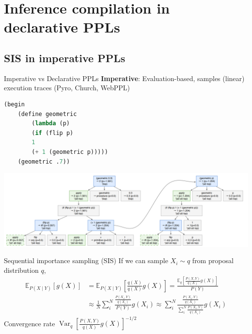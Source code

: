\documentclass[12pt]{beamer}
\DeclareMathOperator*{\Var}{Var}
\begin{document}
\section{Inference compilation in declarative PPLs}

\subsection{SIS in imperative PPLs}

\begin{frame}[fragile]{Imperative vs Declarative PPLs}
    \textbf{Imperative}: Evaluation-based, samples (linear) execution traces
        (Pyro, Church, WebPPL)
    \pause
    \begin{lstlisting}[language=lisp]
(begin
    (define geometric
        (lambda (p)
        (if (flip p)
        1
        (+ 1 (geometric p)))))
    (geometric .7))
        \end{lstlisting}

        \includegraphics[width=1.0\textwidth]{figures/execution-trace.png}
\end{frame}

\begin{frame}{Sequential importance sampling (SIS)}
    If we can sample $X_i \sim q$ from proposal distribution $q$,
    \pause
    \begin{align*}
        \mathbb{E}_{P(X \mid Y)}[g(X)]
        &= \mathbb{E}_{P(X \mid Y)}\left[\frac{q(X)}{q(X)} g(X)\right]
        = \frac{\mathbb{E}_{q}\left[\frac{P(X,Y)}{q(X)} g(X)\right]}{P(Y)} \\
        &\approx \frac{1}{N} \sum_{i}^N \frac{\frac{P(X_i,Y)}{q(X_i)}}{P(Y)} g(X_i)
        \approx \sum_{i}^N \frac{\frac{P(X_i,Y)}{q(X_i)}}{\sum_i^N \frac{P(X_i, Y)}{q(X_i)}} g(X_i)
    \end{align*}
    \pause
    Convergence rate $\Var_q\left[\frac{P(X, Y)}{q(X)} g(X)\right]^{-1/2}$ \cite{yuan2007theoretical}
\end{frame}
\end{document}
